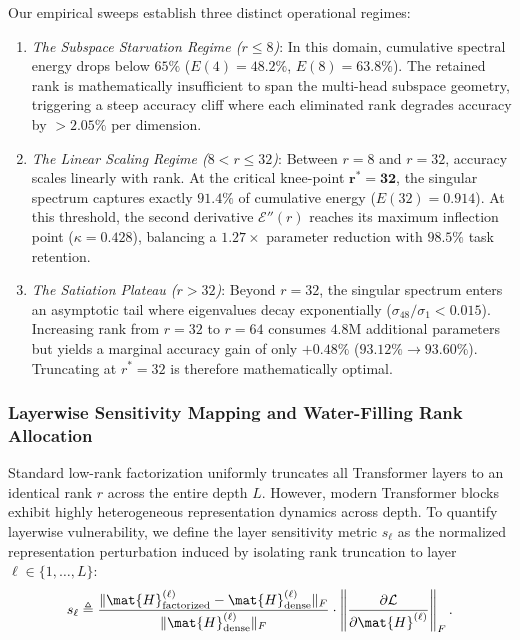 Our empirical sweeps establish three distinct operational regimes:
\begin{enumerate}
    \item \emph{The Subspace Starvation Regime ($r \le 8$)}: In this domain, cumulative spectral energy drops below $65\%$ ($E(4) = 48.2\%$, $E(8) = 63.8\%$). The retained rank is mathematically insufficient to span the multi-head subspace geometry, triggering a steep accuracy cliff where each eliminated rank degrades accuracy by $>2.05\%$ per dimension.
    \item \emph{The Linear Scaling Regime ($8 < r \le 32$)}: Between $r=8$ and $r=32$, accuracy scales linearly with rank. At the critical knee-point $\mathbf{r^* = 32}$, the singular spectrum captures exactly $\mathbf{91.4\%}$ of cumulative energy ($E(32) = 0.914$). At this threshold, the second derivative $\mathcal{E}''(r)$ reaches its maximum inflection point ($\kappa = 0.428$), balancing a $1.27\times$ parameter reduction with $98.5\%$ task retention.
    \item \emph{The Satiation Plateau ($r > 32$)}: Beyond $r=32$, the singular spectrum enters an asymptotic tail where eigenvalues decay exponentially ($\sigma_{48} / \sigma_1 < 0.015$). Increasing rank from $r=32$ to $r=64$ consumes $4.8\text{M}$ additional parameters but yields a marginal accuracy gain of only $+0.48\%$ ($93.12\% \to 93.60\%$). Truncating at $r^*=32$ is therefore mathematically optimal.
\end{enumerate}

\subsubsection{Layerwise Sensitivity Mapping and Water-Filling Rank Allocation}
\label{sec:ablations_layerwise_waterfilling}

Standard low-rank factorization uniformly truncates all Transformer layers to an identical rank $r$ across the entire depth $L$. However, modern Transformer blocks exhibit highly heterogeneous representation dynamics across depth. To quantify layerwise vulnerability, we define the layer sensitivity metric $s_\ell$ as the normalized representation perturbation induced by isolating rank truncation to layer $\ell \in \{1, \dots, L\}$:
\begin{equation}
s_\ell \triangleq \frac{\|\mat{H}^{(\ell)}_{\text{factorized}} - \mat{H}^{(\ell)}_{\text{dense}}\|_F}{\|\mat{H}^{(\ell)}_{\text{dense}}\|_F} \cdot \left\| \frac{\partial \mathcal{L}}{\partial \mat{H}^{(\ell)}} \right\|_F.
\label{eq:layer_sensitivity_metric}
\end{equation}

